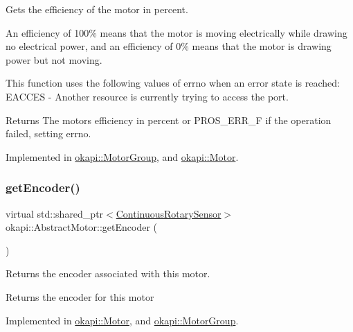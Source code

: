 Gets the efficiency of the motor in percent.

An efficiency of 100\% means that the motor is moving electrically while drawing no electrical power, and an efficiency of 0\% means that the motor is drawing power but not moving.

This function uses the following values of errno when an error state is reached\+: E\+A\+C\+C\+ES -\/ Another resource is currently trying to access the port.

\begin{DoxyReturn}{Returns}
The motor\textquotesingle{}s efficiency in percent or P\+R\+O\+S\+\_\+\+E\+R\+R\+\_\+F if the operation failed, setting errno. 
\end{DoxyReturn}


Implemented in \mbox{\hyperlink{classokapi_1_1MotorGroup_a16413d00d77dd73b4977e8b7f73a33ce}{okapi\+::\+Motor\+Group}}, and \mbox{\hyperlink{classokapi_1_1Motor_a7703340c95e9e7dcafa243685a7d2d50}{okapi\+::\+Motor}}.

\mbox{\label{classokapi_1_1AbstractMotor_a87177280c20a855a74354dd8ba6e1d6a}} 
\subsubsection{\texorpdfstring{getEncoder()}{getEncoder()}}
{\footnotesize\ttfamily virtual std\+::shared\+\_\+ptr$<$\mbox{\hyperlink{classokapi_1_1ContinuousRotarySensor}{Continuous\+Rotary\+Sensor}}$>$ okapi\+::\+Abstract\+Motor\+::get\+Encoder (\begin{DoxyParamCaption}{ }\end{DoxyParamCaption})\hspace{0.3cm}{\ttfamily [pure virtual]}}

Returns the encoder associated with this motor.

\begin{DoxyReturn}{Returns}
the encoder for this motor 
\end{DoxyReturn}


Implemented in \mbox{\hyperlink{classokapi_1_1Motor_a57d8ddb900475fcfba56413e61e6e252}{okapi\+::\+Motor}}, and \mbox{\hyperlink{classokapi_1_1MotorGroup_a911d4c2a66deafb2e54f66411eceaa59}{okapi\+::\+Motor\+Group}}.

\mbox{\label{classokapi_1_1AbstractMotor_ae8225381a81ca0b54469949a6022b775}} 
